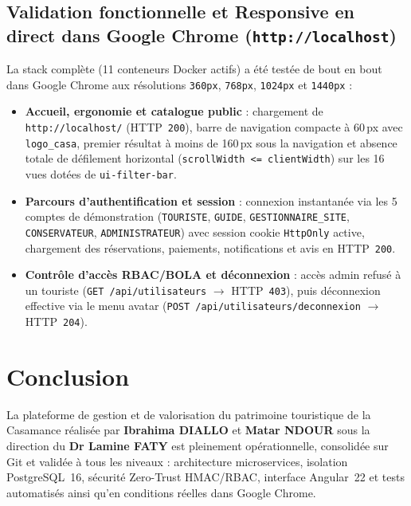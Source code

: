 \documentclass[12pt,a4paper]{report}
\begin{document}
\section{Validation fonctionnelle et Responsive en direct dans Google Chrome (\texttt{http://localhost})}
La stack complète (11 conteneurs Docker actifs) a été testée de bout en bout dans Google Chrome aux résolutions \texttt{360px}, \texttt{768px}, \texttt{1024px} et \texttt{1440px} :
\begin{itemize}
    \item \textbf{Accueil, ergonomie et catalogue public} : chargement de \texttt{http://localhost/} (HTTP~\texttt{200}), barre de navigation compacte à 60\,px avec \texttt{logo\_casa}, premier résultat à moins de 160\,px sous la navigation et absence totale de défilement horizontal (\texttt{scrollWidth <= clientWidth}) sur les 16 vues dotées de \texttt{ui-filter-bar}.
    \item \textbf{Parcours d'authentification et session} : connexion instantanée via les 5 comptes de démonstration (\texttt{TOURISTE}, \texttt{GUIDE}, \texttt{GESTIONNAIRE\_SITE}, \texttt{CONSERVATEUR}, \texttt{ADMINISTRATEUR}) avec session cookie \texttt{HttpOnly} active, chargement des réservations, paiements, notifications et avis en HTTP~\texttt{200}.
    \item \textbf{Contrôle d'accès RBAC/BOLA et déconnexion} : accès admin refusé à un touriste (\texttt{GET /api/utilisateurs} $\rightarrow$ HTTP~\texttt{403}), puis déconnexion effective via le menu avatar (\texttt{POST /api/utilisateurs/deconnexion} $\rightarrow$ HTTP~\texttt{204}).
\end{itemize}

\chapter{Conclusion}

La plateforme de gestion et de valorisation du patrimoine touristique de la Casamance réalisée par \textbf{Ibrahima DIALLO} et \textbf{Matar NDOUR} sous la direction du \textbf{Dr Lamine FATY} est pleinement opérationnelle, consolidée sur Git et validée à tous les niveaux : architecture microservices, isolation PostgreSQL~16, sécurité Zero-Trust HMAC/RBAC, interface Angular~22 et tests automatisés ainsi qu'en conditions réelles dans Google Chrome.
\end{document}
